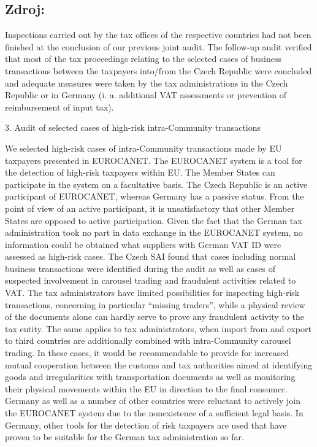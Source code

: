 \documentclass[10pt]{article}
\begin{document}
\subsection*{Zdroj:}

Inspections carried out by the tax offices of the respective countries had not been finished at the conclusion of our previous joint audit.
The follow-up audit verified that most of the tax proceedings relating to the selected cases of business transactions between the taxpayers into/from the Czech Republic were concluded and adequate measures were taken by the tax administrations in the Czech Republic or in Germany (i. a. additional VAT assessments or prevention of reimbursement of input tax).


3. Audit of selected cases of high-risk intra-Community transactions

We selected high-risk cases of intra-Community transactions made by EU taxpayers presented in EUROCANET.
The EUROCANET system is a tool for the detection of high-risk taxpayers within EU.
The Member States can participate in the system on a facultative basis.
The Czech Republic is an active participant of EUROCANET, whereas Germany has a passive status.
From the point of view of an active participant, it is unsatisfactory that other Member States are opposed to active participation.
Given the fact that the German tax administration took no part in data exchange in the EUROCANET system, no information could be obtained what suppliers with German VAT ID were assessed as high-risk cases.
The Czech SAI found that cases including normal business transactions were identified during the audit as well as cases of suspected involvement in carousel trading and fraudulent activities related to VAT.
The tax administrators have limited possibilities for inspecting high-risk transactions, concerning in particular “missing traders”, while a physical review of the documents alone can hardly serve to prove any fraudulent activity to the tax entity.
The same applies to tax administrators, when import from and export to third countries are additionally combined with intra-Community carousel trading.
In these cases, it would be recommendable to provide for increased mutual cooperation between the customs and tax authorities aimed at identifying goods and irregularities with transportation documents as well as monitoring their physical movements within the EU in direction to the final consumer.
Germany as well as a number of other countries were reluctant to actively join the EUROCANET system due to the nonexistence of a sufficient legal basis.
In Germany, other tools for the detection of risk taxpayers are used that have proven to be suitable for the German tax administration so far.
\end{document}
